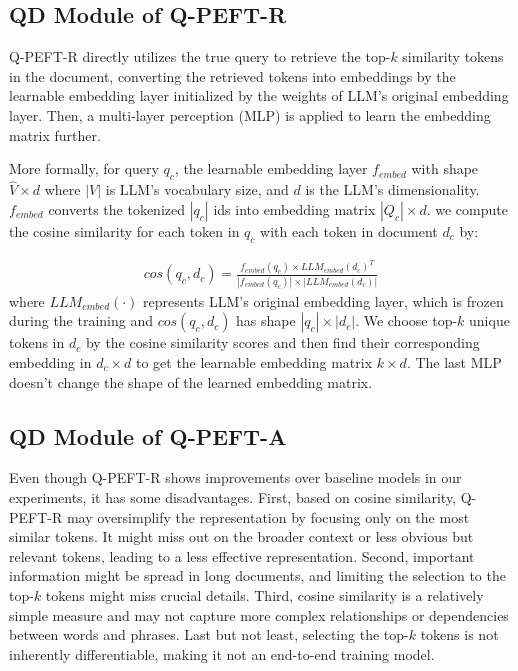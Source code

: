 \documentclass[sigconf,natbib=true,anonymous=false]{acmart}
\begin{document}
\subsection{QD Module of Q-PEFT-R} \label{sec: q-peft-r}
Q-PEFT-R directly utilizes the true query to retrieve the top-$k$ similarity tokens in the document, converting the retrieved tokens into embeddings by the learnable embedding layer initialized by the weights of LLM's original embedding layer. Then, a multi-layer perception (MLP) is applied to learn the embedding matrix further. 

More formally, for query $q_{c}$, the learnable embedding layer $f_{embed}$ with shape $\hat{V} \times d$ where $|V|$ is LLM's vocabulary size, and $d$ is the LLM's dimensionality. $f_{embed}$ converts the tokenized $|q_{c}|$ ids into embedding matrix $|Q_{c}| \times d$. we compute the cosine similarity for each token in $q_{c}$ with each token in document $d_{c}$ by:

\begin{equation}
\begin{aligned}
cos(q_{c}, d_{c}) = \frac{f_{embed}(q_{c}) \times LLM_{embed}(d_{c})^{T}}{|f_{embed}(q_{c})| \times |LLM_{embed}(d_{c})|}
\end{aligned}
\end{equation}
where $LLM_{embed}(\cdot)$ represents LLM's original embedding layer, which is frozen during the training and $cos(q_{c}, d_{c})$ has shape $|q_{c}| \times |d_{c}|$. We choose top-$k$ unique tokens in $d_{c}$ by the cosine similarity scores and then find their corresponding embedding in $d_{c} \times d$ to get the learnable embedding matrix $k \times d$. The last MLP doesn't change the shape of the learned embedding matrix. 

\subsection{QD Module of Q-PEFT-A} \label{sec: q-peft-a}

Even though Q-PEFT-R shows improvements over baseline models in our experiments, it has some disadvantages. First, based on cosine similarity, Q-PEFT-R may oversimplify the representation by focusing only on the most similar tokens. It might miss out on the broader context or less obvious but relevant tokens, leading to a less effective representation. Second, important information might be spread in long documents, and limiting the selection to the top-$k$ tokens might miss crucial details. Third, cosine similarity is a relatively simple measure and may not capture more complex relationships or dependencies between words and phrases. Last but not least, selecting the top-$k$ tokens is not inherently differentiable, making it not an end-to-end training model. 
\end{document}
